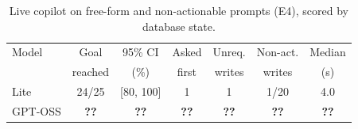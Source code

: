 \begin{table}[t]
\centering
\caption{Live copilot on free-form and non-actionable prompts (E4), scored by database state.}
\label{tab:e4}
\small
\setlength{\tabcolsep}{3pt}
\begin{tabular}{@{}lcccccc@{}}
\toprule
Model & Goal & 95\% CI & Asked & Unreq. & Non-act. & Median \\
 & reached & (\%) & first & writes & writes & (s) \\
\midrule
Lite & 24/25 & [80, 100] & 1 & 1 & 1/20 & 4.0 \\
GPT-OSS & \textbf{??} & \textbf{??} & \textbf{??} & \textbf{??} & \textbf{??} & \textbf{??} \\
\bottomrule
\end{tabular}
\end{table}
